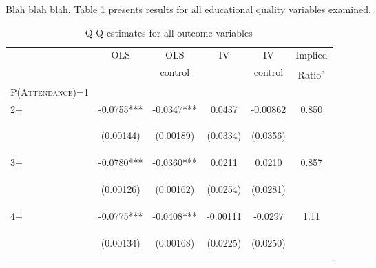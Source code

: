 \documentclass{article}[11pt,subeqn]
\begin{document}
\begin{spacing}{1.25}
Blah blah blah.  Table \ref{tab:fertilityALL} presents results for all educational quality variables examined.
\begin{table}[!htbp]
\caption{Q-Q estimates for all outcome variables}
\vspace{-3mm}
\label{tab:fertilityALL}
\begin{center}
\begin{tabular}{lccccc} \toprule 
& OLS & OLS  & IV & IV & Implied \\ 
&  &  control &  & control & Ratio\textsuperscript{a} \\ 
\midrule
\textsc{P(Attendance)=1} & & & & &\\
2+ & -0.0755*** & -0.0347*** & 0.0437  & -0.00862 & 0.850 \\
\vspace{4pt} & \begin{footnotesize}(0.00144)\end{footnotesize} & \begin{footnotesize}(0.00189)\end{footnotesize} & \begin{footnotesize}(0.0334)\end{footnotesize} & \begin{footnotesize}(0.0356)\end{footnotesize} & \begin{footnotesize}\end{footnotesize} \\
3+ & -0.0780*** &	-0.0360*** & 0.0211 & 0.0210 &  0.857 \\
\vspace{4pt} & \begin{footnotesize}(0.00126)\end{footnotesize} & \begin{footnotesize}(0.00162)\end{footnotesize} & \begin{footnotesize}(0.0254)\end{footnotesize} & \begin{footnotesize}(0.0281)\end{footnotesize} & \begin{footnotesize}\end{footnotesize} \\
4+ & -0.0775*** &	-0.0408*** & -0.00111 &	-0.0297 &  1.11 \\
\vspace{4pt} & \begin{footnotesize}(0.00134)\end{footnotesize} & \begin{footnotesize}(0.00168)\end{footnotesize} & \begin{footnotesize}(0.0225)\end{footnotesize} & \begin{footnotesize}(0.0250)\end{footnotesize} & \begin{footnotesize}\end{footnotesize} \\

\end{tabular}
\end{center}
\end{table}
\end{spacing}
\end{document}
